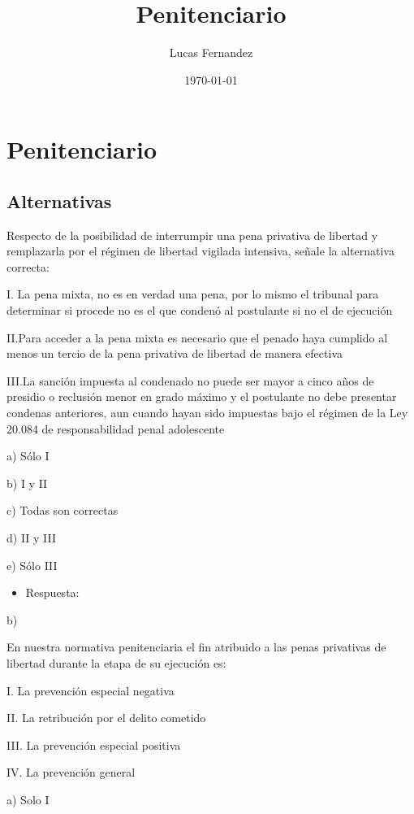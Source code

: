 \documentclass[letterpaper, 11pt]{article}
\author{Lucas Fernandez}
\date{\today}
\title{Penitenciario}
\begin{document}
\maketitle
\tableofcontents

\section{Penitenciario}
\label{sec:org84b049b}

\subsection{Alternativas}
\label{sec:org558a193}

Respecto de la posibilidad de interrumpir una pena privativa de libertad y
remplazarla por el régimen de libertad vigilada intensiva, señale la alternativa
correcta:

I. La pena mixta, no es en verdad una pena, por lo mismo el tribunal para determinar
si procede no es el que condenó al postulante si no el de ejecución

II.Para acceder a la pena mixta es necesario que el penado haya cumplido al menos
un tercio de la pena privativa de libertad de manera efectiva

III.La sanción impuesta al condenado no puede ser mayor a cinco años
de presidio o reclusión menor en grado máximo y el postulante no debe
presentar condenas anteriores, aun cuando hayan sido impuestas bajo el
régimen de la Ley 20.084 de responsabilidad penal adolescente


a) Sólo I

b) I y II

c) Todas son correctas

d) II y III

e) Sólo III

\begin{itemize}
\item Respuesta:
\end{itemize}
b)

En nuestra normativa penitenciaria el fin atribuido a las penas privativas de
libertad durante la etapa de su ejecución es:

I. La prevención especial negativa

II. La retribución por el delito cometido

III. La prevención especial positiva

IV. La prevención general

a) Solo I
\end{document}

